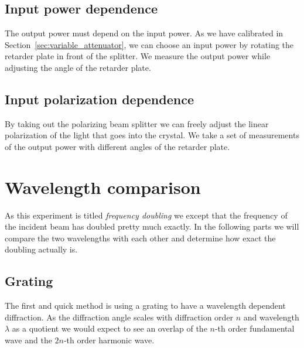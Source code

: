 \documentclass[11pt, english, fleqn, DIV=15, headinclude, BCOR=2cm]{scrreprt}
\begin{document}
\subsection{Input power dependence}

The output power must depend on the input power. As we have calibrated in
Section~\ref{sec:variable_attenuator}, we can choose an input power by rotating
the retarder plate in front of the splitter. We measure the output power while
adjusting the angle of the retarder plate.



\subsection{Input polarization dependence}

By taking out the polarizing beam splitter we can freely adjust the linear
polarization of the light that goes into the crystal. We take a set of
measurements of the output power with different angles of the retarder plate.



\section{Wavelength comparison}

As this experiment is titled \emph{frequency doubling} we except that the
frequency of the incident beam has doubled pretty much exactly. In the
following parts we will compare the two wavelengths with each other and
determine how exact the doubling actually is.

\subsection{Grating}

The first and quick method is using a grating to have a wavelength dependent
diffraction. As the diffraction angle scales with diffraction order $n$ and
wavelength $\lambda$ as a quotient we would expect to see an overlap of the
$n$-th order fundamental wave and the $2n$-th order harmonic wave.
\end{document}

